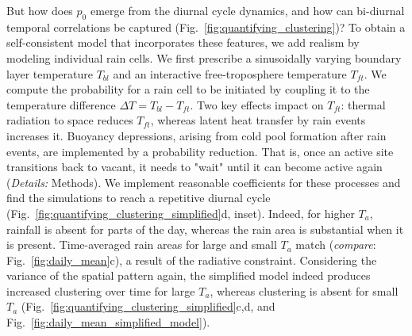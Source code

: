 \documentclass[draft,linenumbers]{agujournal2019}
\begin{document}
But how does $p_0$ emerge from the diurnal cycle dynamics, and how can bi-diurnal temporal correlations be captured (Fig.~\ref{fig:quantifying_clustering})?
To obtain a self-consistent model that incorporates these features, we add realism by modeling individual rain cells.
We first prescribe a sinusoidally varying boundary layer temperature $T_{bl}$ and an interactive free-troposphere temperature $T_{ft}$.
We compute the probability for a rain cell to be initiated by coupling it to the temperature difference $\Delta T=T_{bl}-T_{ft}$.
Two key effects impact on $T_{ft}$: 
thermal radiation to space reduces $T_{ft}$, whereas latent heat transfer by rain events increases it.
Buoyancy depressions, arising from cold pool formation after rain events, are implemented by a probability reduction. That is, once an active site transitions back to vacant, it needs to "wait" until it can become active again 
({\it Details:} Methods).
We implement reasonable coefficients for these processes and find the simulations to reach a repetitive diurnal cycle (Fig.~\ref{fig:quantifying_clustering_simplified}d, inset).
Indeed, for higher $T_a$, rainfall is absent for parts of the day, whereas the rain area is substantial when it is present. 
Time-averaged rain areas for large and small $T_a$ match ({\it compare}: Fig.~\ref{fig:daily_mean}c), a result of the radiative constraint.
Considering the variance of the spatial pattern again, the simplified model indeed produces increased clustering over time for large $T_a$, whereas clustering is absent for small $T_a$ (Fig.~\ref{fig:quantifying_clustering_simplified}c,d, and Fig.~\ref{fig:daily_mean_simplified_model}).
\end{document}
